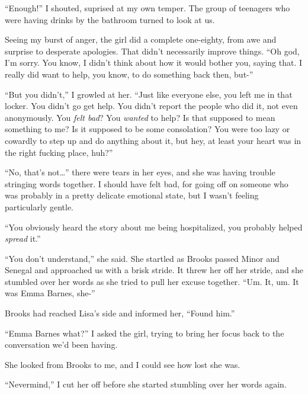 ``Enough!'' I shouted, suprised at my own temper.  The group of teenagers who were having drinks by the bathroom turned to look at us.



Seeing my burst of anger, the girl did a complete one-eighty, from awe and surprise to desperate apologies.  That didn't necessarily improve things.  ``Oh god, I'm sorry.  You know, I didn't think about how it would bother you, saying that.  I really did want to help, you know, to do something back then, but-''



``But you didn't,'' I growled at her.  ``Just like everyone else, you left me in that locker.  You didn't go get help.  You didn't report the people who did it, not even anonymously.  You \emph{felt bad}?  You \emph{wanted} to help?  Is that supposed to mean something to me?  Is it supposed to be some consolation? You were too lazy or cowardly to step up and do anything about it, but hey, at least your heart was in the right fucking place, huh?''



``No, that's not\ldots'' there were tears in her eyes, and she was having trouble stringing words together.  I should have felt bad, for going off on someone who was probably in a pretty delicate emotional state, but I wasn't feeling particularly gentle.



``You obviously heard the story about me being hospitalized, you probably helped \emph{spread} it.''



``You don't understand,'' she said.  She startled as Brooks passed Minor and Senegal and approached us with a brisk stride.  It threw her off her stride, and she stumbled over her words as she tried to pull her excuse together.  ``Um.  It, um.  It was Emma Barnes, she-''



Brooks had reached Lisa's side and informed her, ``Found him.''



``Emma Barnes what?'' I asked the girl, trying to bring her focus back to the conversation we'd been having.



She looked from Brooks to me, and I could see how lost she was.



``Nevermind,'' I cut her off before she started stumbling over her words again.



